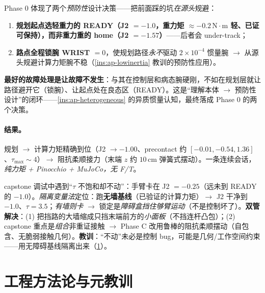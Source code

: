 \begin{insight}\label{ins:ap-preventive}
Phase 0 体现了两个\emph{预防性}设计决策——把前面踩的坑\emph{在源头}规避：
\begin{enumerate}
  \item \textbf{规划起点选轻重力的 READY（J2 $=-1.0$，重力矩 $\approx-0.2\,\mathrm{N\!\cdot\! m}$ 轻、已证可保持），而非重力重的 home（J2 $=-1.57$）}——后者会 under-track；
  \item \textbf{路点全程锁腕 WRIST $=0$}，使规划路径\emph{永不}驱动 $2\times10^{-4}$ 惯量腕 $\to$ 从源头规避计算力矩腕不稳（\cref{ins:ap-lowinertia} 教训的预防性应用）。
\end{enumerate}
\textbf{最好的故障处理是让故障不发生}：与其在控制层和病态腕硬刚，不如在规划层就让路径避开它（锁腕）、让起点处在良态区（READY）。这是“理解本体 $\to$ 预防性设计”的闭环——\cref{ins:ap-heterogeneous} 的异质惯量认知，最终落成 Phase 0 的两个决策。
\end{insight}

\paragraph{结果。}
规划 $\to$ 计算力矩精确到位（J2 $\to-1.00$、precontact 约 $[-0.01,-0.54,1.36]$、$\tau_{\max}\sim4$）$\to$ 阻抗柔顺接力（末端 $z$ 约 $10\,\mathrm{cm}$ 弹簧式摆动）。一条连续会话，\emph{纯力矩 + Pinocchio + MuJoCo，无 F/T}。

\begin{pitfall}\label{pit:ap-wall-block}
capstone 调试中遇到“$\tau$ 不饱和却不动”：手臂卡在 J2 $=-0.25$（远未到 READY 的 $-1.0$）。\emph{隔离变量法}定位：跑\textbf{无墙基线}（已验证的计算力矩）$\to$ J2 干净到 $-1.0$、$\tau=3.5$；\emph{有墙则卡} $\to$ 锁定是\emph{障碍盒挡住够臂运动}（不是控制坏了）。\textbf{双管解决}：(1) 把挡路的大墙缩成只挡末端前方的\emph{小面板}（不挡连杆凸包）；(2) capstone 重点是\emph{组合}非重证接触 $\to$ Phase C 改用鲁棒的阻抗柔顺摆动（自包含、无脆弱接触几何）。\textbf{教训}：“不动”未必是控制 bug，可能是几何/工作空间约束——用无障碍基线隔离出来（\cref{sec:ap-methodology}）。
\end{pitfall}

\section{工程方法论与元教训}
\label{sec:ap-methodology}

